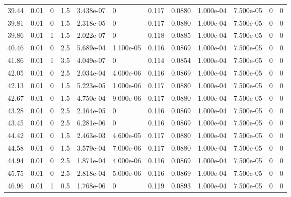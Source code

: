 \documentclass[preview]{standalone}
\begin{document}
{{{\begin{tabular}{L{1.2cm}C{1.2cm} C{0.3cm}C{0.5cm} C{1.4cm}C{1.4cm} C{1.4cm}C{1.4cm} C{1.6cm}C{1.6cm} C{1.6cm}C{1.6cm}}
  39.44  &  0.01  & 0     & 1.5 &  3.438e-07  & 0  &  0.117&   0.0880& 1.000e-04 & 7.500e-05   &  0 & 0  \\ 
  39.81  &  0.01  & 0     & 1.5 &  2.318e-05  & 0  &  0.117&   0.0880& 1.000e-04 & 7.500e-05   &  0 & 0  \\ 
  39.86  &  0.01  & 1     & 1.5 &  2.022e-07  & 0  &  0.118&   0.0885& 1.000e-04 & 7.500e-05   &  0 & 0  \\ 
  40.46  &  0.01  & 0     & 2.5 &  5.689e-04  & 1.100e-05  &  0.116&   0.0869& 1.000e-04 & 7.500e-05   &  0 & 0  \\ 
  41.86  &  0.01  & 1     & 3.5 &  4.049e-07  & 0  &  0.114&   0.0854& 1.000e-04 & 7.500e-05   &  0 & 0  \\ 
  42.05  &  0.01  & 0     & 2.5 &  2.034e-04  & 4.000e-06  &  0.116&   0.0869& 1.000e-04 & 7.500e-05   &  0 & 0  \\ 
  42.13  &  0.01  & 0     & 1.5 &  5.223e-05  & 1.000e-06  &  0.117&   0.0880& 1.000e-04 & 7.500e-05   &  0 & 0  \\ 
  42.67  &  0.01  & 0     & 1.5 &  4.750e-04  & 9.000e-06  &  0.117&   0.0880& 1.000e-04 & 7.500e-05   &  0 & 0  \\ 
  43.28  &  0.01  & 0     & 2.5 &  2.164e-05  & 0  &  0.116&   0.0869& 1.000e-04 & 7.500e-05   &  0 & 0  \\ 
  43.45  &  0.01  & 0     & 2.5 &  6.281e-06  & 0  &  0.116&   0.0869& 1.000e-04 & 7.500e-05   &  0 & 0  \\ 
  44.42  &  0.01  & 0     & 1.5 &  2.463e-03  & 4.600e-05  &  0.117&   0.0880& 1.000e-04 & 7.500e-05   &  0 & 0  \\ 
  44.58  &  0.01  & 0     & 1.5 &  3.579e-04  & 7.000e-06  &  0.117&   0.0880& 1.000e-04 & 7.500e-05   &  0 & 0  \\ 
  44.94  &  0.01  & 0     & 2.5 &  1.871e-04  & 4.000e-06  &  0.116&   0.0869& 1.000e-04 & 7.500e-05   &  0 & 0  \\ 
  45.75  &  0.01  & 0     & 2.5 &  2.818e-04  & 5.000e-06  &  0.116&   0.0869& 1.000e-04 & 7.500e-05   &  0 & 0  \\ 
  46.96  &  0.01  & 1     & 0.5 &  1.768e-06  & 0  &  0.119&   0.0893& 1.000e-04 & 7.500e-05   &  0 & 0  \\ 
\hline 
\end{tabular} 

}}}
\end{document}

